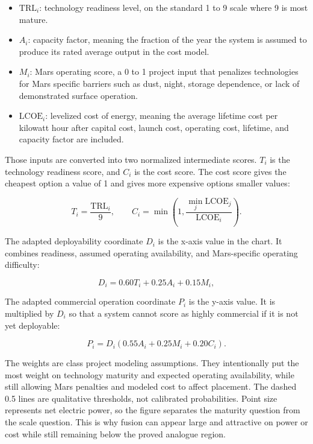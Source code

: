 \documentclass[11pt]{article}
\begin{document}
\begin{itemize}
    \item \(\mathrm{TRL}_i\): technology readiness level, on the standard 1 to 9 scale where 9 is most mature.
    \item \(A_i\): capacity factor, meaning the fraction of the year the system is assumed to produce its rated average output in the cost model.
    \item \(M_i\): Mars operating score, a 0 to 1 project input that penalizes technologies for Mars specific barriers such as dust, night, storage dependence, or lack of demonstrated surface operation.
    \item \(\mathrm{LCOE}_i\): levelized cost of energy, meaning the average lifetime cost per kilowatt hour after capital cost, launch cost, operating cost, lifetime, and capacity factor are included.
\end{itemize}

Those inputs are converted into two normalized intermediate scores. \(T_i\) is the technology readiness score, and \(C_i\) is the cost score. The cost score gives the cheapest option a value of 1 and gives more expensive options smaller values:

\[
T_i = \frac{\mathrm{TRL}_i}{9}, \qquad
C_i = \min\left(1,\frac{\min_j \mathrm{LCOE}_j}{\mathrm{LCOE}_i}\right).
\]

The adapted deployability coordinate \(D_i\) is the x-axis value in the chart. It combines readiness, assumed operating availability, and Mars-specific operating difficulty:

\[
D_i = 0.60T_i + 0.25A_i + 0.15M_i,
\]

The adapted commercial operation coordinate \(P_i\) is the y-axis value. It is multiplied by \(D_i\) so that a system cannot score as highly commercial if it is not yet deployable:

\[
P_i = D_i(0.55A_i + 0.25M_i + 0.20C_i).
\]

The weights are class project modeling assumptions. They intentionally put the most weight on technology maturity and expected operating availability, while still allowing Mars penalties and modeled cost to affect placement. The dashed 0.5 lines are qualitative thresholds, not calibrated probabilities. Point size represents net electric power, so the figure separates the maturity question from the scale question. This is why fusion can appear large and attractive on power or cost while still remaining below the proved analogue region.
\end{document}
